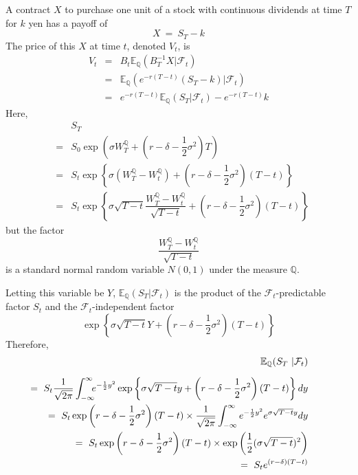 \documentclass[uplatex,a4j,12pt,dvipdfmx]{jsarticle}
\begin{document}
A contract $X$ to purchase one unit of a stock with continuous dividends at time $T$ for $k$ yen has a payoff of
$$
	X \ = \ S_{T} - k
$$
The price of this $X$ at time $t$, denoted $V_{t}$, is
%
%
\begin{eqnarray*}
	V_{t}
	&=&
	B_{t}
	\mathbb{E}_{\mathbb{Q}} ( B^{-1}_{T} X | \mathcal{F}_{t} )
	\\ &=&
	\mathbb{E}_{\mathbb{Q}} ( e^{-r(T-t)} (S_{T} - k) | \mathcal{F}_{t} )
	\\ &=&
	e^{-r(T-t)} \mathbb{E}_{\mathbb{Q}} ( S_{T}  | \mathcal{F}_{t} ) - e^{-r(T-t)} k
\end{eqnarray*}
%
%
Here,
%
%
\begin{eqnarray*}
	&&
	S_{T}
	\\ &=&
	S_{0}
	\exp
	\left(
	\sigma W^{\mathbb{Q}}_{T}
	+
	\left(
	r
	- \delta
	- \dfrac{1}{2} \sigma^{2}
	\right)
	T
	\right)
	\\ &=&
	S_{t}
	\exp
	\left\{
	\sigma ( W^{\mathbb{Q}}_{T} - W^{\mathbb{Q}}_{t} )
	+
	\left(
	r
	- \delta
	- \dfrac{1}{2} \sigma^{2}
	\right)
	(T-t)
	\right\}
	\\ &=&
	S_{t}
	\exp
	\left\{
	\sigma \sqrt{T-t}
	\dfrac{ W^{\mathbb{Q}}_{T} - W^{\mathbb{Q}}_{t} }
	{\sqrt{T-t}}
	+
	\left(
	r
	- \delta
	- \dfrac{1}{2} \sigma^{2}
	\right)
	(T-t)
	\right\}
\end{eqnarray*}
%
%
but the factor
$$
	\dfrac{ W^{\mathbb{Q}}_{T} - W^{\mathbb{Q}}_{t} }
	{\sqrt{T-t}}
$$
is a standard normal random variable $N(0,1)$ under the measure $\mathbb{Q}$.

Letting this variable be $Y$,
$\mathbb{E}_{\mathbb{Q}} ( S_{T}  | \mathcal{F}_{t} )$
is the product of the $\mathcal{F}_{t}$-predictable factor $S_{t}$ and the $\mathcal{F}_{t}$-independent factor
$$
	\exp
	\left\{
	\sigma \sqrt{T-t}
	Y
	+
	\left(
	r
	- \delta
	- \dfrac{1}{2} \sigma^{2}
	\right)
	(T-t)
	\right\}
$$
Therefore,
%
%
\begin{eqnarray*}
	&&
	\hspace{-10mm}
	\mathbb{E}_{\mathbb{Q}} ( S_{T}  | \mathcal{F}_{t} )
	\\[2mm] &&
	\hspace{-10mm}
	= \
	S_{t}
	\dfrac{1}{\sqrt{2\pi}}
	\int^{\infty}_{-\infty}
	\!\!\!
	e^{-\frac{1}{2} y^{2}}
	\exp
	\left\{
	\sigma \sqrt{T-t}
	y
	+
	\left(
	r
	- \delta
	- \dfrac{1}{2} \sigma^{2}
	\right)
	(T-t)
	\right\}
	dy
	\\ &&
	\hspace{-10mm}
	= \
	S_{t}
	\exp
	\left(
	r
	- \delta
	- \dfrac{1}{2} \sigma^{2}
	\right)
	(T-t)
	\times
	\dfrac{1}{\sqrt{2\pi}}
	\int^{\infty}_{-\infty}
	e^{-\frac{1}{2} y^{2}}
	e^{\sigma \sqrt{T-t} y}
	dy
	\\ &&
	\hspace{-10mm}
	= \
	S_{t}
	\exp
	\left(
	r
	- \delta
	- \dfrac{1}{2} \sigma^{2}
	\right)
	(T-t)
	\times
	\exp
	\left(
	\dfrac{1}{2} (\sigma \sqrt{T-t})^{2}
	\right)
	\\ &&
	\hspace{-10mm}
	= \
	S_{t} e^{(r-\delta)(T-t)}
\end{eqnarray*}
%
%
\end{document}
